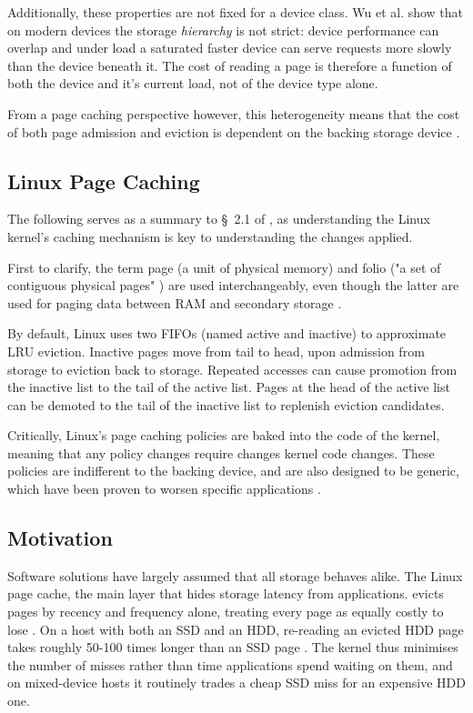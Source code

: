 \documentclass[11pt,sigconf,nonacm]{acmart}
\begin{document}
Additionally, these properties are not fixed for a device class. Wu et al.\cite{orthus} show that on modern devices the storage \textit{hierarchy} is not strict: device performance can overlap and under load a saturated faster device can serve requests more slowly than the device beneath it. The cost of reading a page is therefore a function of both the device and it's current load, not of the device type alone.

From a page caching perspective however, this heterogeneity means that the cost of both page admission and eviction is dependent on the backing storage device \cite{forney, arch}.

\subsection{Linux Page Caching}

The following serves as a summary to \S~2.1 of \cite{cache_ext}, as understanding the Linux kernel's caching mechanism is key to understanding the changes applied.

First to clarify, the term page (a unit of physical memory) and folio ("a set of contiguous physical pages" \cite{cache_ext}) are used interchangeably, even though the latter are used for paging data between RAM and secondary storage \cite{cache_ext}.

By default, Linux uses two FIFOs (named active and inactive) to approximate LRU eviction. Inactive pages move from tail to head, upon admission from storage to eviction back to storage. Repeated accesses can cause promotion from the inactive list to the tail of the active list. Pages at the head of the active list can be demoted to the tail of the inactive list to replenish eviction candidates.

Critically, Linux's page caching policies are baked into the code of the kernel, meaning that any policy changes require changes kernel code changes. These policies are indifferent to the backing device, and are also designed to be generic, which have been proven to worsen specific applications \cite{cache_ext}.

\subsection{Motivation}

Software solutions have largely assumed that all storage behaves alike. The Linux page cache, the main layer that hides storage latency from applications. evicts pages by recency and frequency alone, treating every page as equally costly to lose \cite{multigenlru}. On a host with both an SSD and an HDD, re-reading an evicted HDD page takes roughly 50-100 times longer than an SSD page \cite{ssdvshdd}. The kernel thus minimises the number of misses rather than time applications spend waiting on them, and on mixed-device hosts it routinely trades a cheap SSD miss for an expensive HDD one.
\end{document}
